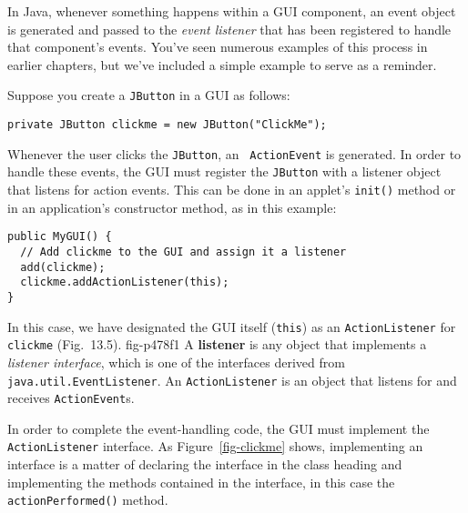 In Java, whenever something happens within a GUI component, an event
object is generated and passed to the {\it event listener} that has
been registered to handle that component's events.  You've seen
numerous examples of this process in earlier chapters, but we've
included a simple example to serve as a reminder.

Suppose you create a {\tt JButton} in a GUI as follows:

\begin{jjjlisting}
\begin{lstlisting}
private JButton clickme = new JButton("ClickMe");
\end{lstlisting}
\end{jjjlisting}

\noindent Whenever the user clicks the {\tt JButton}, an {\tt
ActionEvent} is generated.  In order to handle these events, the GUI
must register the {\tt JButton} with a listener object that listens
for action events.  This can be done in an applet's {\tt init()}
method or in an application's constructor method, as in this example:

\begin{jjjlisting}
\begin{lstlisting}
public MyGUI() {
  // Add clickme to the GUI and assign it a listener
  add(clickme);  
  clickme.addActionListener(this); 
}
\end{lstlisting}
\end{jjjlisting}

\noindent In this case, we have designated the GUI itself ({\tt this})
as an {\tt ActionListener} for {\tt clickme} (Fig.~13.5).
{fig-p478f1}
A {\bf listener} is any object that implements a {\it listener
interface}, which is one of the interfaces derived from {\tt
java.util.Event\-Listener}.  An {\tt ActionListener} is an object that
listens for and receives {\tt ActionEvent}s.

\pagebreak
In order to complete the event-handling code, the GUI must implement
the {\tt ActionListener} interface.  As Figure~\ref{fig-clickme}
shows, implementing an interface is a matter of declaring the
interface in the class heading and implementing the methods contained
in the interface, in this case the {\tt actionPerformed()} method.

